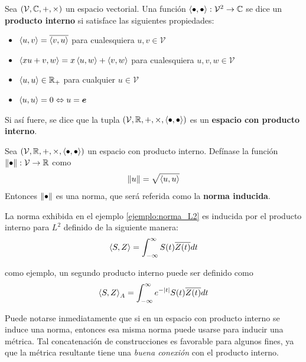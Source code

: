 \begin{definicion}
Sea $(\mathcal{V},\mathbb{C},+,\times)$ un espacio vectorial. Una función $\left\langle \bullet,\bullet \right\rangle : \mathcal{V}^{2}\rightarrow \mathbb{C}$ se dice un \textbf{producto interno} si satisface las siguientes propiedades:
\begin{itemize}
\item $\left\langle u,v \right\rangle = \overline{\left\langle v,u \right\rangle}$ para cualesquiera $u,v \in \mathcal{V}$
\item $\left\langle x u + v, w \right\rangle = x \left\langle u,w \right\rangle + \left\langle v,w \right\rangle$ para cualesquiera $u,v,w \in \mathcal{V}$
\item $\left\langle u,u \right\rangle \in \mathbb{R}_+$ para cualquier $u \in \mathcal{V}$
\item $\left\langle u,u \right\rangle = 0 \Leftrightarrow u = \boldsymbol{e}$
\end{itemize}
Si así fuere, se dice que la tupla $(\mathcal{V},\mathbb{R},+,\times, \left\langle \bullet,\bullet \right\rangle)$ es un \textbf{espacio con producto interno}.
\end{definicion}

\begin{proposicion}
Sea $(\mathcal{V},\mathbb{R},+,\times, \left\langle \bullet,\bullet \right\rangle)$ un espacio con producto interno. Defínase la función $\left\Vert \bullet \right\Vert: \mathcal{V} \rightarrow \mathbb{R}$ como
\begin{equation}
\left\Vert u \right\Vert = \sqrt{\left\langle u,u \right\rangle}
\end{equation}
Entonces $\left\Vert \bullet \right\Vert$ es una norma, que será referida como la \textbf{norma inducida}.
\end{proposicion}

\begin{ejemplo}
La norma exhibida en el ejemplo \ref{ejemplo:norma_L2} es inducida por el producto interno para $L^{2}$ definido de la siguiente manera:
\begin{equation}
\left\langle S,Z \right\rangle = \int_{-\infty}^{\infty} S(t) \overline{Z(t)} dt
\end{equation}

como ejemplo, un segundo producto interno puede ser definido como
\begin{equation}
\left\langle S,Z \right\rangle_A = \int_{-\infty}^{\infty} e^{-\left| t \right|} S(t) \overline{Z(t)} dt
\end{equation}
\end{ejemplo}


Puede notarse inmediatamente que si en un espacio con producto interno se induce una norma, entonces esa misma norma puede usarse para inducir una métrica.
%
Tal concatenación de construcciones es favorable para algunos fines, ya que la métrica resultante tiene una \textit{buena conexión} con el producto interno.

